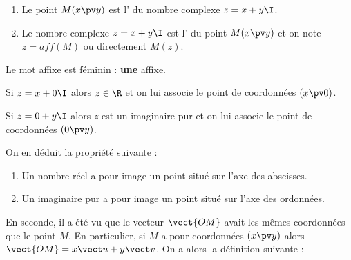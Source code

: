 \documentclass[10pt,openright,twoside,french]{book}
\begin{document}
\begin{Defi}
    \begin{enumerate}
        \item Le point $M(x \pv y)$ est l' du nombre complexe $z = x + y\I$.
        \item Le nombre complexe $z = x + y\I$ est l' du point $M(x \pv y)$ et on note $z = aff(M)$ ou directement $M(z)$.
    \end{enumerate} 
\end{Defi}

\begin{Rmq}
    Le mot affixe est féminin : \textbf{une} affixe.
\end{Rmq}

Si $z = x + 0\I$ alors $z\in \R$ et on lui associe le point de coordonnées $(x \pv 0)$.\par
Si $z = 0 +y\I$ alors $z$ est un imaginaire pur et on lui associe le point de coordonnées $(0 \pv y)$.\par
On en déduit la propriété suivante :\medskip

\begin{Prop}
    \begin{enumerate}
        \item Un nombre réel a pour image un point situé sur l'axe des abscisses.
        \item Un imaginaire pur a pour image un point situé sur l'axe des ordonnées.
    \end{enumerate}
\end{Prop}

\begin{center}
\end{center}

En seconde, il a été vu que le vecteur $\vect{OM}$ avait les mêmes coordonnées que le point $M$. En particulier, si $M$ a pour coordonnées $(x \pv y)$ alors $\vect{OM} = x\vect u + y \vect v$. On a alors la définition suivante :
\end{document}

